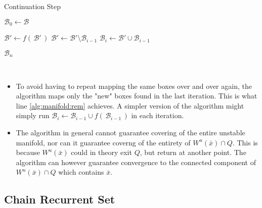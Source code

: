 \begin{algorithm}
    \caption{Continuation Step}
    \label{alg:manifold}
    \begin{algorithmic}[1]
        \State $\mathcal{B}_0 \gets \mathcal{B}$

            \State $\mathcal{B}' \gets f(\,\mathcal{B}'\,)$
            \State $\mathcal{B}' \gets \mathcal{B}' \setminus \mathcal{B}_{i-1}$ 
            \label{alg:manifold:rem}
            \State $\mathcal{B}_i \gets \mathcal{B}' \cup \mathcal{B}_{i-1}$
        \EndFor

        \State \Return $\mathcal{B}_{n}$
    \end{algorithmic}
\end{algorithm}

\begin{remark}\ 
    \begin{itemize}
        \item To avoid having to repeat mapping the same boxes over and over again, 
        the algorithm maps only the "new" boxes found in the last iteration. This is what 
        line \ref{alg:manifold:rem} achieves. A simpler version of the algorithm might simply run 
        $\mathcal{B}_i \gets \mathcal{B}_{i-1} \cup f(\,\mathcal{B}_{i-1}\,)$
        in each iteration.
        \item \cite*{manifold} The algorithm in general cannot guarantee covering of the 
        entire unstable manifold, nor can it guarantee coverng of the entirety of 
        $W^u(\bar{x}) \cap Q$. This is because $W^u(\bar{x})$ could in theory exit $Q$, 
        but return at another point. The algorithm can however guarantee convergence 
        to the connected component of $W^u(\bar{x}) \cap Q$ which contains $\bar{x}$.
    \end{itemize}
\end{remark}


\subsection{Chain Recurrent Set}

